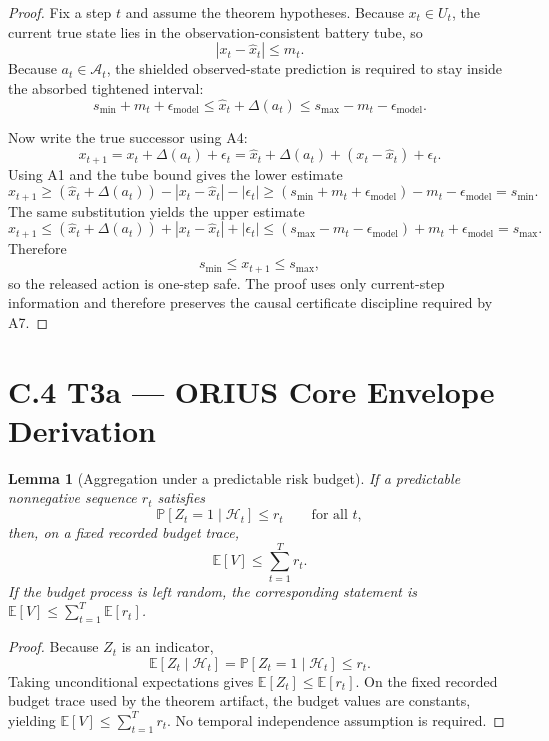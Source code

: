 \documentclass[11pt]{article}
\newtheorem{lemma}{Lemma}[section]
\newcommand{\1}{\mathbf{1}}
\newcommand{\E}{\mathbb{E}}
\newcommand{\Prob}{\mathbb{P}}
\begin{document}
\begin{proof}
Fix a step $t$ and assume the theorem hypotheses. Because $x_t \in U_t$, the
current true state lies in the observation-consistent battery tube, so
\[
  |x_t - \hat{x}_t| \le m_t.
\]
Because $a_t \in \mathcal{A}_t$, the shielded observed-state prediction is
required to stay inside the absorbed tightened interval:
\[
  s_{\min} + m_t + \epsilon_{\mathrm{model}}
  \le
  \hat{x}_t + \Delta(a_t)
  \le
  s_{\max} - m_t - \epsilon_{\mathrm{model}}.
\]

Now write the true successor using A4:
\[
  x_{t+1} = x_t + \Delta(a_t) + \epsilon_t
  =
  \hat{x}_t + \Delta(a_t) + (x_t-\hat{x}_t) + \epsilon_t.
\]
Using A1 and the tube bound gives the lower estimate
\[
  x_{t+1}
  \ge
  (\hat{x}_t + \Delta(a_t)) - |x_t-\hat{x}_t| - |\epsilon_t|
  \ge
  (s_{\min} + m_t + \epsilon_{\mathrm{model}}) - m_t - \epsilon_{\mathrm{model}}
  =
  s_{\min}.
\]
The same substitution yields the upper estimate
\[
  x_{t+1}
  \le
  (\hat{x}_t + \Delta(a_t)) + |x_t-\hat{x}_t| + |\epsilon_t|
  \le
  (s_{\max} - m_t - \epsilon_{\mathrm{model}}) + m_t + \epsilon_{\mathrm{model}}
  =
  s_{\max}.
\]
Therefore
\[
  s_{\min} \le x_{t+1} \le s_{\max},
\]
so the released action is one-step safe. The proof uses only current-step
information and therefore preserves the causal certificate discipline required
by A7. \qedhere
\end{proof}

\section*{C.4 T3a --- ORIUS Core Envelope Derivation}

\begin{lemma}[Aggregation under a predictable risk budget]\label{lem:t3a-budget}
If a predictable nonnegative sequence $r_t$ satisfies
\[
  \Prob[Z_t = 1 \mid \mathcal{H}_t] \le r_t
  \qquad\text{for all } t,
\]
then, on a fixed recorded budget trace,
\[
  \E[V] \le \sum_{t=1}^T r_t.
\]
If the budget process is left random, the corresponding statement is
\(\E[V]\le\sum_{t=1}^T\E[r_t]\).
\end{lemma}

\begin{proof}
Because $Z_t$ is an indicator,
\[
  \E[Z_t \mid \mathcal{H}_t]
  =
  \Prob[Z_t=1 \mid \mathcal{H}_t]
  \le r_t.
\]
Taking unconditional expectations gives \(\E[Z_t]\le\E[r_t]\).  On the fixed
recorded budget trace used by the theorem artifact, the budget values are
constants, yielding $\E[V] \le \sum_{t=1}^T r_t$. No temporal independence
assumption is required. \qedhere
\end{proof}
\end{document}
